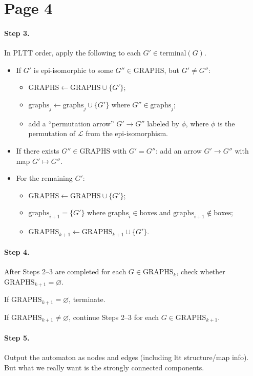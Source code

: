\documentclass[11pt]{article}
\theoremstyle{definition}
\begin{document}
\section*{Page 4}

\paragraph{Step 3.}
In $\mathrm{PLTT}$ order, apply the following to each
$G'\in\mathrm{terminal}(G)$.

\begin{itemize}
  \item If $G'$ is epi-isomorphic to some $G''\in\mathrm{GRAPHS}$, but
        $G'\neq G''$:
        \begin{itemize}
          \item $\mathrm{GRAPHS}\leftarrow \mathrm{GRAPHS}\cup\{G'\}$;
          \item $\mathrm{graphs}_j\leftarrow \mathrm{graphs}_j\cup\{G'\}$ where
                $G''\in\mathrm{graphs}_j$;
          \item add a ``permutation arrow'' $G'\to G''$ labeled by $\phi$, where
                $\phi$ is the permutation of $\mathcal{L}$ from the epi-isomorphism.
        \end{itemize}

  \item If there exists $G''\in\mathrm{GRAPHS}$ with $G'=G''$:
        add an arrow $G'\to G''$ with map $G'\mapsto G''$.

  \item For the remaining $G'$:
        \begin{itemize}
          \item $\mathrm{GRAPHS}\leftarrow \mathrm{GRAPHS}\cup\{G'\}$;
          \item $\mathrm{graphs}_{i+1}=\{G'\}$ where $\mathrm{graphs}_i\in\mathrm{boxes}$
                and $\mathrm{graphs}_{i+1}\notin\mathrm{boxes}$;
          \item $\mathrm{GRAPHS}_{k+1}\leftarrow \mathrm{GRAPHS}_{k+1}\cup\{G'\}$.
        \end{itemize}
\end{itemize}

\paragraph{Step 4.}
After Steps 2--3 are completed for each $G\in\mathrm{GRAPHS}_k$, check whether
$\mathrm{GRAPHS}_{k+1}=\varnothing$.

If $\mathrm{GRAPHS}_{k+1}=\varnothing$, terminate.

If $\mathrm{GRAPHS}_{k+1}\neq\varnothing$, continue Steps 2--3 for each
$G\in\mathrm{GRAPHS}_{k+1}$.

\paragraph{Step 5.}
Output the automaton as nodes and edges (including ltt structure/map info).
But what we really want is the strongly connected components.
\end{document}
